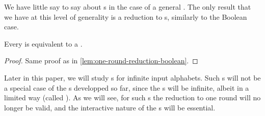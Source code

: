 We have little say to say about  s in the case of a general . The  only result that we have at this level of generality is a
reduction to s, similarly to the Boolean case.

\begin{lemma}
\label{lemma:one-round-reduction-general}
  Every  is equivalent to a .
\end{lemma}
\begin{proof}
  Same proof as in \cref{lem:one-round-reduction-boolean}. 
\end{proof}

 Later in this paper, we will study s for infinite input alphabets. Such s will not be a special case of the s developped so far, since the s will be infinite, albeit in a limited way (called ).  As we will see, for such s the reduction to one round will no longer be valid, and the interactive nature of the s will be essential.
